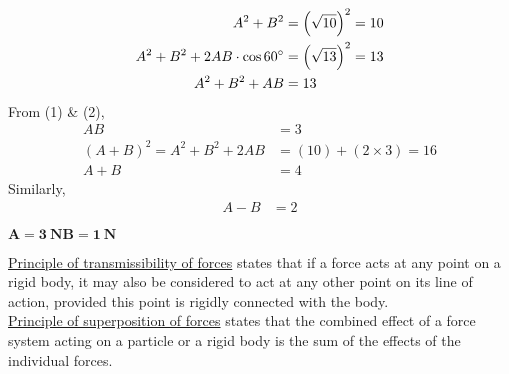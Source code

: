 \documentclass[12pt]{ipu-mechanics}
\begin{document}
    \begin{align}
        A^2 + B^2 &= \left(\sqrt{10}\right)^2 = 10\\
        A^2 + B^2 + 2AB\cdot\cos{60\degree} &= \left(\sqrt{13}\right)^2 = 13\nonumber\\
        A^2 + B^2 + AB &= 13
    \end{align}
    \hspace*{0.3\textwidth}From (1) \& (2),\vspace*{-5pt}
    \begin{align*}
        AB &= 3\\
        (A+B)^2 = A^2 + B^2 + 2AB &= (10) + (2\times{3}) = 16\\
        A+B &= 4
    \end{align*}
    \hspace*{0.3\textwidth}Similarly,\vspace*{-5pt}
    \begin{align*}
        A-B &= 2
    \end{align*}\vspace*{-20pt}
    \parbox{\textwidth}{\centering
        $\bm{\boxed{A = 3~\text{N}}\boxed{B = 1~\text{N}}}$
    }
    \cleardoublepage



    \noindent \underline{Principle of transmissibility of forces} states that if a force acts at any point on a rigid
    body, it may also be considered to act at any other point on its line of action, provided this point is rigidly
    connected with the body.\\

    \noindent\underline{Principle of superposition of forces} states that the combined effect of a force system acting
    on a particle or a rigid body is the sum of the effects of the individual forces.\\
\end{document}
